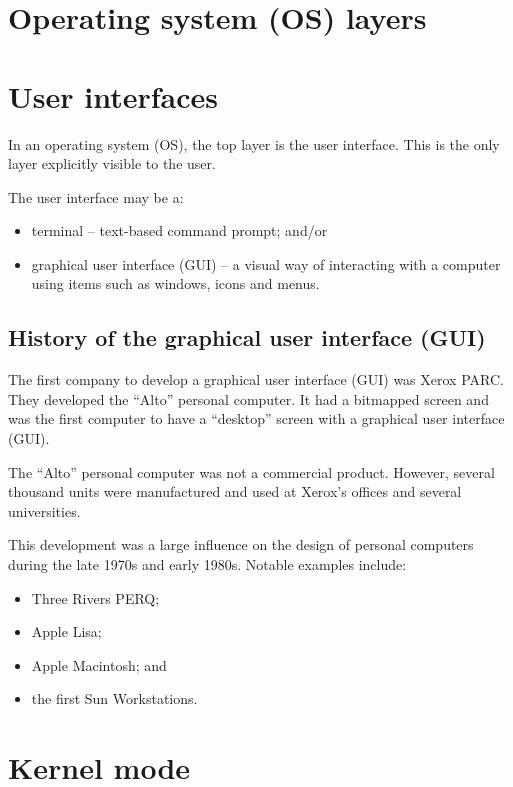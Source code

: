 \documentclass[a4paper]{systems-software}
\begin{document}
\section{Operating system (OS) layers}

\section*{User interfaces}

In an operating system (OS), the top layer is the user interface. This is the only layer explicitly visible to the user.

The user interface may be a:
\begin{itemize}
	\item terminal -- text-based command prompt; and/or
	\item graphical user interface (GUI) -- a visual way of interacting with a computer using items such as windows, icons and menus.
\end{itemize}


\subsection*{History of the graphical user interface (GUI)}

The first company to develop a graphical user interface (GUI) was Xerox PARC. They developed the “Alto” personal computer. It had a bitmapped screen and was the first computer to have a “desktop” screen with a graphical user interface (GUI).

The “Alto” personal computer was not a commercial product. However, several thousand units were manufactured and used at Xerox’s offices and several universities.

This development was a large influence on the design of personal computers during the late 1970s and early 1980s. Notable examples include:
\begin{itemize}
	\item Three Rivers PERQ;
	\item Apple Lisa;
	\item Apple Macintosh; and
	\item the first Sun Workstations.
\end{itemize}


\newpage

\section{Kernel mode}
\end{document}

